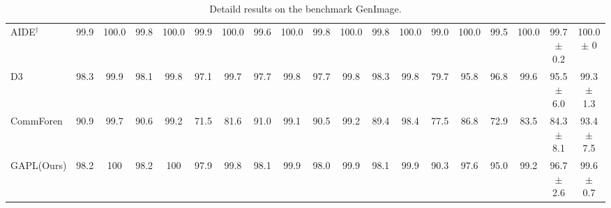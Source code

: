 \begin{table}[!t]
{\begin{tabular}{l cc cc cc cc cc cc cc cc cc}
AIDE$^\dagger$ \cite{yan2024sanity} & 99.9 & 100.0 & 99.8 & 100.0 & 99.9 & 100.0 & 99.6 & 100.0 & 99.8 & 100.0 & 99.8 & 100.0 & 99.0 & 100.0 & 99.5 & 100.0 & 99.7 $\pm$ 
 0.2 & 100.0$\pm$  0\\
D3 \cite{yang2025d3} & 98.3 & 99.9 & 98.1 & 99.8 & 97.1 & 99.7 & 97.7 & 99.8 & 97.7 & 99.8 & 98.3 & 99.8 & 79.7 & 95.8 & 96.8 & 99.6 & 95.5 $\pm$  6.0  & 99.3 $\pm$ 1.3  \\
CommForen \cite{park2025commfor} & 90.9 & 99.7 & 90.6 & 99.2 & 71.5 & 81.6 & 91.0 & 99.1 & 90.5 & 99.2 & 89.4 & 98.4 & 77.5 & 86.8 & 72.9 & 83.5 & 84.3 $\pm$ 8.1 & 93.4 $\pm$ 7.5\\
\rowcolor{cvprblue!20} 
GAPL(Ours) & 98.2 & 100 & 98.2 & 100 & 97.9 & 99.8 &  98.1 & 99.9 & 98.0 & 99.9 & 98.1 & 99.9 & 90.3 & 97.6 & 95.0 & 99.2 & 96.7$\pm$ 2.6 & 99.6 $\pm$ 0.7 \\
\bottomrule
\end{tabular}
}
\caption{Detaild results on the benchmark GenImage.}
\label{tab:GenImage}
\end{table}

\clearpage

